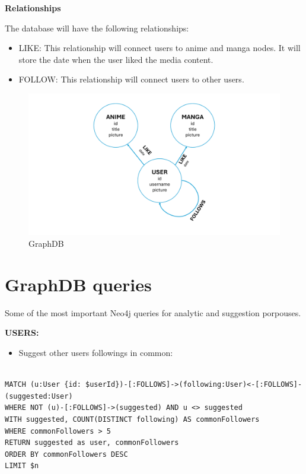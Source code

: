\textbf{Relationships}


The database will have the following relationships:
\begin{itemize}
    \item LIKE: This relationship will connect users to anime and manga nodes. It will store the date when the user liked the media content.
    \item FOLLOW: This relationship will connect users to other users. 
\end{itemize}

\begin{figure}[htbp]
    \centering
    \includegraphics[width=\textwidth]{Media/graph.pdf}
    \caption{GraphDB}
    \label{fig:GraohDB}
\end{figure}

\newpage
\section{GraphDB queries}
Some of the most important Neo4j queries for analytic and suggestion porpouses.


\textbf{USERS:}

\begin{itemize}
  \item Suggest other users followings in common:
\end{itemize}
\begin{lstlisting}[language=Cypher, caption=SuggestUsersByCommonFollowings]

MATCH (u:User {id: $userId})-[:FOLLOWS]->(following:User)<-[:FOLLOWS]-(suggested:User) 
WHERE NOT (u)-[:FOLLOWS]->(suggested) AND u <> suggested 
WITH suggested, COUNT(DISTINCT following) AS commonFollowers 
WHERE commonFollowers > 5 
RETURN suggested as user, commonFollowers 
ORDER BY commonFollowers DESC 
LIMIT $n
\end{lstlisting}

